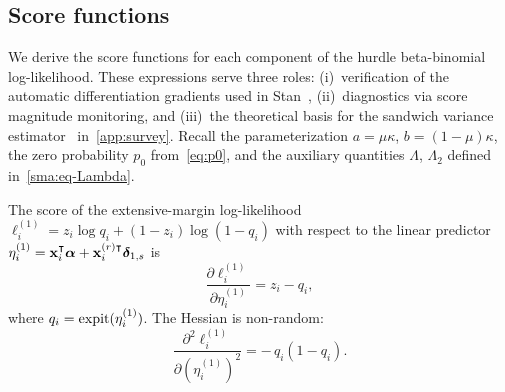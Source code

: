 
\subsection{Score functions}
\label{smb:scores}

We derive the score functions for each component of the hurdle
beta-binomial log-likelihood.  These expressions serve three roles:
\textup{(i)}~verification of the automatic differentiation gradients
used in Stan~\citep{CarpenterEtAl2017}, \textup{(ii)}~diagnostics via
score magnitude monitoring,
and \textup{(iii)}~the theoretical basis for the sandwich variance
estimator~\citep{Binder1983} in~\cref{app:survey}.
Recall the parameterization $a = \mu\kappa$, $b = (1-\mu)\kappa$, the
zero probability $p_0$ from~\eqref{eq:p0}, and the auxiliary quantities
$\Lambda$, $\Lambda_2$ defined in~\cref{sma:eq-Lambda}.


\begin{proposition}
\label{smb:prop-score-ext}
  The score of the extensive-margin log-likelihood
  $\ell_i^{(1)} = z_i\log q_i + (1-z_i)\log(1-q_i)$ with respect to
  the linear predictor
  $\eta_i^{(1)} = \mathbf{x}_i^\intercal\boldsymbol{\alpha} + \mathbf{x}_i^{(r)\intercal}\boldsymbol{\delta}_{1,s}$ is
  \begin{equation}\label{smb:eq-score-ext}
    \frac{\partial\ell_i^{(1)}}{\partial\eta_i^{(1)}}
    = z_i - q_i,
  \end{equation}
  where $q_i = \operatorname{expit}(\eta_i^{(1)})$.  The Hessian is non-random:
  \begin{equation}\label{smb:eq-hess-ext}
    \frac{\partial^2\ell_i^{(1)}}{\partial(\eta_i^{(1)})^2}
    = -\,q_i(1-q_i).
  \end{equation}
\end{proposition}

